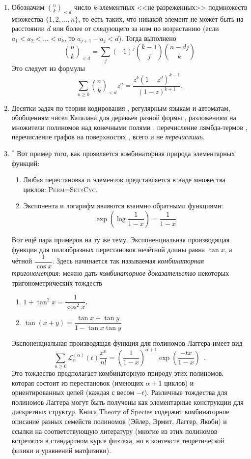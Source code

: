 \documentclass{article}
\theoremstyle{definition}
\begin{document}
\begin{enumerate}
	\item Обозначим \( {n \choose k}_{<d} \) число \( k \)-элементных <<не 
	разреженных>> подмножеств множества \( \{1,2,\ldots, n\} \), то есть таких, 
	что никакой элемент не может быть на расстоянии \( d \) или более от 
	следующего за ним по возрастанию (если \( a_1 < a_2 < \ldots < a_k \), то 
	\( a_{j+1} - a_j < d \)). Тогда выполнено
	\[
		{n \choose k}_{<d} = \sum_j (-1)^j {k-1 \choose j}{n - dj \choose k}
	\]
	Это следует из формулы
	\[
		\sum_{n \geq 0} {n \choose k}_{<d} z^n = \dfrac{z^k 
		(1-z^d)^{k-1}}{(1-z)^{k+1}}.
	\]
	\item Десятки задач по теории кодирования \cite[Section I.4, I.24, p. 
	53]{ac}, регулярным языкам и автоматам, обобщениям чисел Каталана для 
	деревьев разной формы \cite[Section I.5]{ac}, разложениям на множители 
	полиномов над конечными полями \cite[Example VII.4, p. 449]{ac}, 
	перечисление лямбда-термов \cite{lambda}, перечисление графов на 
	поверхностях \cite{graphs_manifolds}, всего и не \textit{перечислишь}.
	\item\( ^{\ast} \) Вот пример того, как проявляется комбинаторная природа 
	элементарных функций:
	\begin{enumerate}
	\item Любая перестановка \( n \) элементов представляется в виде множества 
	циклов: \textsc{Perm}=\textsc{Set}\( \circ \)\textsc{Cyc}.
	\item Экспонента и логарифм являются взаимно обратными функциями:
	\[
		\exp\left(\log \dfrac{1}{1 - x}\right) = \dfrac{1}{1 - x}
	\]
	\end{enumerate}
	Вот ещё пара примеров на ту же тему. Экспоненциальная производящая функция 
	для пилообразных перестановок нечётной длины равна \( \tan x \), а чётной 
	\( \dfrac{1}{\cos x} \). Здесь начинается так называемая 
	\textit{комбинаторная тригонометрия}: можно дать \textit{комбинаторное 
	доказательство} некоторых тригонометрических тождеств \cite[Exercise 5.7, 
	p. 74]{stanley2}
	\begin{enumerate}
		\item \( 1 + \tan^2 x = \dfrac{1}{\cos^2 x} \),
		\item \( \tan(x + y) = \dfrac{\tan x + \tan y}{1 - \tan x \tan y} \)
	\end{enumerate}
	Экспоненциальная производящая функция для полиномов Лаггера имеет вид
	\[
		\sum_{n \geq 0}\mathcal L^{(\alpha)}_{n}(t) \dfrac{x^n}{n!} = 
		\left(\dfrac{1}{1 - x}\right)^{\alpha + 1} \exp\left(
			\dfrac{-tx}{1 - x}
		\right) \enspace .
	\]
	Это тождество предполагает комбинаторную природу этих полиномов, которая 
	состоит из перестановок (имеющих \( \alpha + 1 \) циклов) и ориентированных 
	цепей (каждая с весом \( -t \)). Различные тождества для полиномов Лаггера 
	могут быть получены как элементарные конструкции для дискретных структур. 
	Книга Theory of Species
	\cite{species} содержит комбинаторное описание разных семейств полиномов 
	(Эйлер, Эрмит, Лаггер, Якоби) и 
	ссылки на соответствующую литературу (многие из этих полиномов встретятся в 
	стандартном курсе физтеха, но в контексте теоретической физики и уравнений 
	матфизики).
\end{enumerate}
\end{document}
